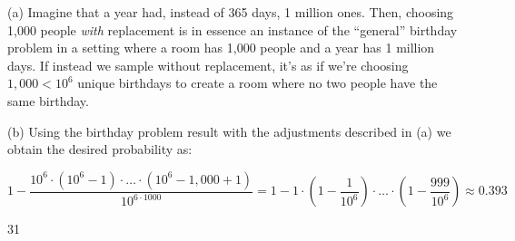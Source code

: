 \begin{solution}
    
    (a) Imagine that a year had, instead of 365 days, 1 million ones.
    Then, choosing 1,000 people \textit{with} replacement is in essence an instance of the ``general'' birthday problem in a setting where a room has 1,000 people and a year has 1 million days.
    If instead we sample without replacement, it's as if we're choosing $1,000 < 10^6$ unique birthdays to create a room where no two people have the same birthday.

    (b) Using the birthday problem result with the adjustments described in (a) we obtain the desired probability as:

    \[1 - \frac{10^6 \cdot (10^6 - 1) \cdot \ldots \cdot (10^6 - 1,000 + 1)}{10^{6\cdot 1000}}  = 1 - 1 \cdot(1 - \frac{1}{10^6}) \cdot \ldots \cdot (1 - \frac{999}{10^6}) \approx 0.393\]

\end{solution}

\begin{exercise}{31}
    
\end{exercise}

